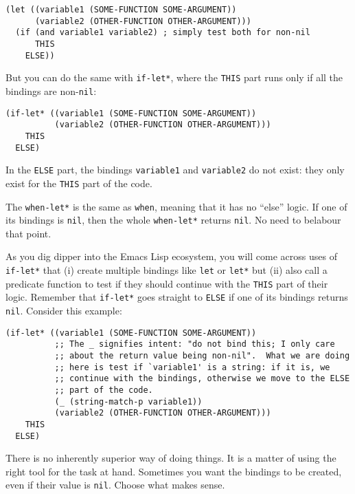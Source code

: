 \documentclass[11pt]{ctexart}
\begin{document}
\begin{verbatim}
(let ((variable1 (SOME-FUNCTION SOME-ARGUMENT))
      (variable2 (OTHER-FUNCTION OTHER-ARGUMENT)))
  (if (and variable1 variable2) ; simply test both for non-nil
      THIS
    ELSE))
\end{verbatim}

But you can do the same with \texttt{if-let*}, where the \texttt{THIS} part runs only if all the bindings are non-\texttt{nil}:

\begin{verbatim}
(if-let* ((variable1 (SOME-FUNCTION SOME-ARGUMENT))
          (variable2 (OTHER-FUNCTION OTHER-ARGUMENT)))
    THIS
  ELSE)
\end{verbatim}

In the \texttt{ELSE} part, the bindings \texttt{variable1} and \texttt{variable2} do not exist: they only exist for the \texttt{THIS} part of the code.

The \texttt{when-let*} is the same as \texttt{when}, meaning that it has no ``else'' logic. If one of its bindings is \texttt{nil}, then the whole \texttt{when-let*} returns \texttt{nil}. No need to belabour that point.

As you dig dipper into the Emacs Lisp ecosystem, you will come across uses of \texttt{if-let*} that (i) create multiple bindings like \texttt{let} or \texttt{let*} but (ii) also call a predicate function to test if they should continue with the \texttt{THIS} part of their logic. Remember that \texttt{if-let*} goes straight to \texttt{ELSE} if one of its bindings returns \texttt{nil}. Consider this example:

\begin{verbatim}
(if-let* ((variable1 (SOME-FUNCTION SOME-ARGUMENT))
          ;; The _ signifies intent: "do not bind this; I only care
          ;; about the return value being non-nil".  What we are doing
          ;; here is test if `variable1' is a string: if it is, we
          ;; continue with the bindings, otherwise we move to the ELSE
          ;; part of the code.
          (_ (string-match-p variable1))
          (variable2 (OTHER-FUNCTION OTHER-ARGUMENT)))
    THIS
  ELSE)
\end{verbatim}

There is no inherently superior way of doing things. It is a matter of using the right tool for the task at hand. Sometimes you want the bindings to be created, even if their value is \texttt{nil}. Choose what makes sense.
\end{document}

